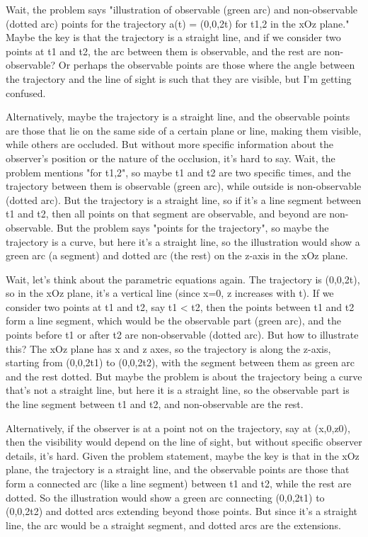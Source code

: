 Wait, the problem says "illustration of observable (green arc) and non-observable (dotted arc) points for the trajectory a(t) = (0,0,2t) for t1,2 in the xOz plane." Maybe the key is that the trajectory is a straight line, and if we consider two points at t1 and t2, the arc between them is observable, and the rest are non-observable? Or perhaps the observable points are those where the angle between the trajectory and the line of sight is such that they are visible, but I'm getting confused.

Alternatively, maybe the trajectory is a straight line, and the observable points are those that lie on the same side of a certain plane or line, making them visible, while others are occluded. But without more specific information about the observer's position or the nature of the occlusion, it's hard to say. Wait, the problem mentions "for t1,2", so maybe t1 and t2 are two specific times, and the trajectory between them is observable (green arc), while outside is non-observable (dotted arc). But the trajectory is a straight line, so if it's a line segment between t1 and t2, then all points on that segment are observable, and beyond are non-observable. But the problem says "points for the trajectory", so maybe the trajectory is a curve, but here it's a straight line, so the illustration would show a green arc (a segment) and dotted arc (the rest) on the z-axis in the xOz plane.

Wait, let's think about the parametric equations again. The trajectory is (0,0,2t), so in the xOz plane, it's a vertical line (since x=0, z increases with t). If we consider two points at t1 and t2, say t1 < t2, then the points between t1 and t2 form a line segment, which would be the observable part (green arc), and the points before t1 or after t2 are non-observable (dotted arc). But how to illustrate this? The xOz plane has x and z axes, so the trajectory is along the z-axis, starting from (0,0,2t1) to (0,0,2t2), with the segment between them as green arc and the rest dotted. But maybe the problem is about the trajectory being a curve that's not a straight line, but here it is a straight line, so the observable part is the line segment between t1 and t2, and non-observable are the rest.

Alternatively, if the observer is at a point not on the trajectory, say at (x,0,z0), then the visibility would depend on the line of sight, but without specific observer details, it's hard. Given the problem statement, maybe the key is that in the xOz plane, the trajectory is a straight line, and the observable points are those that form a connected arc (like a line segment) between t1 and t2, while the rest are dotted. So the illustration would show a green arc connecting (0,0,2t1) to (0,0,2t2) and dotted arcs extending beyond those points. But since it's a straight line, the arc would be a straight segment, and dotted arcs are the extensions.

